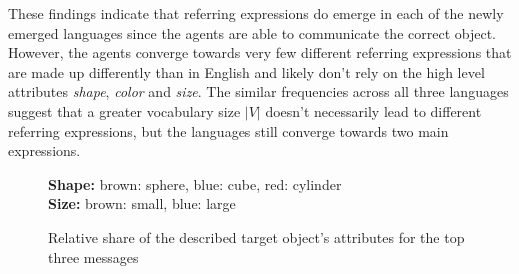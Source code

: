 These findings indicate that referring expressions do emerge in each of the newly emerged languages since the agents are able to communicate the correct object.
However, the agents converge towards very few different referring expressions that are made up differently than in English and likely don't rely on the high level attributes \emph{shape}, \emph{color} and \emph{size}.
The similar frequencies across all three languages suggest that a greater vocabulary size $|V|$ doesn't necessarily lead to different referring expressions, but the languages still converge towards two main expressions.

\begin{figure}[ht]
    \centering
    \caption{Relative share of the described target object's attributes for the top three messages}

    \textbf{Shape:} brown: sphere, blue: cube, red: cylinder \\
    \textbf{Size:} brown: small, blue: large
    \label{fig:language_analysis_vocabularies}
\end{figure}

